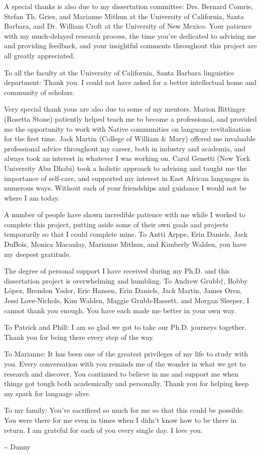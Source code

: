 A special thanks is also due to my dissertation committee: Drs. Bernard Comrie, Stefan Th. Gries, and Marianne Mithun at the University of California, Santa Barbara, and Dr. William Croft at the University of New Mexico. Your patience with my much-delayed research process, the time you've dedicated to advising me and providing feedback, and your insightful comments throughout this project are all greatly appreciated.

To all the faculty at the University of California, Santa Barbara linguistics department: Thank you. I could not have asked for a better intellectual home and community of scholars.

Very special thank yous are also due to some of my mentors. Marion Bittinger (Rosetta Stone) patiently helped teach me to become a professional, and provided me the opportunity to work with Native communities on language revitalization for the first time. Jack Martin (College of William \& Mary) offered me invaluable professional advice throughout my career, both in industry and academia, and always took an interest in whatever I was working on. Carol Genetti (New York University Abu Dhabi) took a holistic approach to advising and taught me the importance of self-care, and supported my interest in East African languages in numerous ways. Without each of your friendships and guidance I would not be where I am today.

A number of people have shown incredible patience with me while I worked to complete this project, putting aside some of their own goals and projects temporarily so that I could complete mine. To Antti Arppe, Erin Daniels, Jack DuBois, Monica Macaulay, Marianne Mithun, and Kimberly Walden, you have my deepest gratitude.

The degree of personal support I have received during my Ph.D. and this dissertation project is overwhelming and humbling. To Andrew Grubb†, Bobby López, Brendon Yoder, Eric Hansen, Erin Daniels, Jack Martin, James Oren, Jessi Love-Nichols, Kim Walden, Maggie Grubb-Hassett, and Morgan Sleeper, I cannot thank you enough. You have each made me better in your own way.

To Patrick and Phill: I am so glad we got to take our Ph.D. journeys together. Thank you for being there every step of the way.

To Marianne: It has been one of the greatest privileges of my life to study with you. Every conversation with you reminds me of the wonder in what we get to research and discover. You continued to believe in me and support me when things got tough both academically and personally. Thank you for helping keep my spark for language alive.

To my family: You've sacrificed so much for me so that this could be possible. You were there for me even in times when I didn't know how to be there in return. I am grateful for each of you every single day. I love you.

\hfill\textasciitilde{ }Danny

\doublespacing
